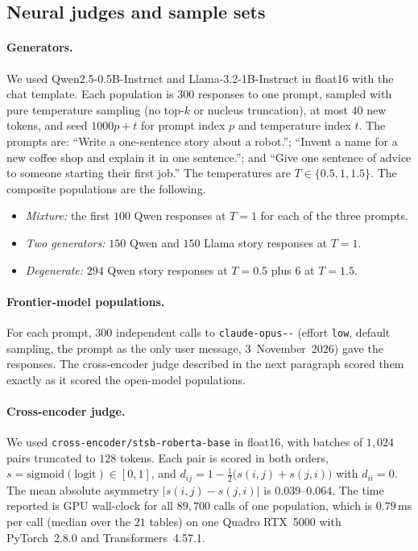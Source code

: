 \subsection{Neural judges and sample sets}
\label{app:exp-details:judge}

\paragraph{Generators.} We used Qwen2.5-0.5B-Instruct and
Llama-3.2-1B-Instruct in float16 with the chat template. Each population is
$300$ responses to one prompt, sampled with pure temperature sampling (no
top-$k$ or nucleus truncation), at most $40$ new tokens, and seed
$1000p+t$ for prompt index $p$ and temperature index $t$. The prompts are:
``Write a one-sentence story about a robot.''; ``Invent a name for a new
coffee shop and explain it in one sentence.''; and ``Give one sentence of
advice to someone starting their first job.'' The temperatures are
$T\in\{0.5,1,1.5\}$. The composite populations are the following.
\begin{itemize}
  \item \emph{Mixture:} the first $100$ Qwen responses at $T=1$ for each
  of the three prompts.
  \item \emph{Two generators:} $150$ Qwen and $150$ Llama story responses
  at $T=1$.
  \item \emph{Degenerate:} $294$ Qwen story responses at $T=0.5$ plus $6$
  at $T=1.5$.
\end{itemize}

\paragraph{Frontier-model populations.} For each prompt, $300$ independent
calls to \texttt{claude-\allowbreak opus--} (effort \texttt{low}, default sampling,
the prompt as the only user message, 3~November~2026) gave the responses. The
cross-encoder judge described in the next paragraph scored them exactly as it scored the open-model populations.

\paragraph{Cross-encoder judge.} We used
\texttt{cross-encoder/stsb-roberta-base} in float16, with batches of
$1{,}024$ pairs truncated to $128$ tokens. Each pair is scored in both
orders, ${s=\mathrm{sigmoid}(\text{logit})\in[0,1]}$, and
$d_{ij}=1-\tfrac12\bigl(s(i,j)+s(j,i)\bigr)$ with $d_{ii}=0$. The mean
absolute asymmetry $\lvert s(i,j)-s(j,i)\rvert$ is $0.039$--$0.064$. The
time reported is GPU wall-clock for all $89{,}700$ calls of one
population, which is $0.79$\,ms per call (median over the $21$ tables) on
one Quadro RTX~5000 with PyTorch~2.8.0 and Transformers~4.57.1.

